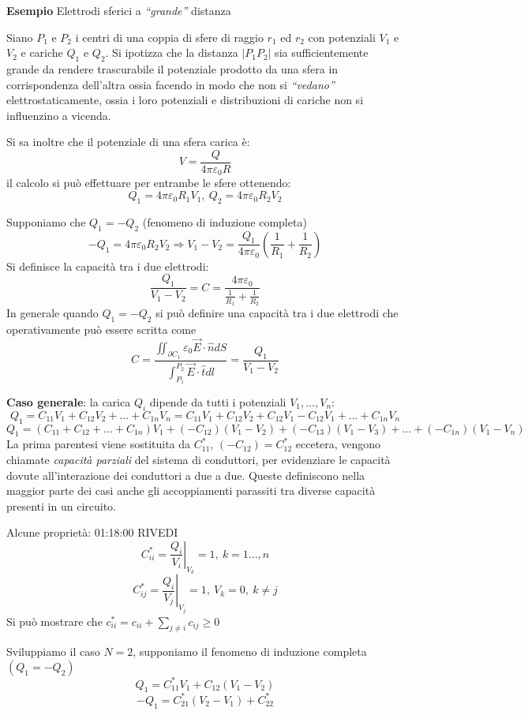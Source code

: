 \textbf{Esempio} Elettrodi sferici a \textit{``grande''} distanza

Siano $P_1$ e $P_2$ i centri di una coppia di sfere di raggio $r_1$ ed $r_2$ con potenziali $V_1$ e
$V_2$ e cariche $Q_1$ e $Q_2$.
Si ipotizza che la distanza $|P_1P_2|$ sia sufficientemente grande da rendere trascurabile il potenziale
prodotto da una sfera in corrispondenza dell'altra ossia facendo in modo che non si \textit{``vedano''} 
elettrostaticamente, ossia i loro potenziali e distribuzioni di cariche non si influenzino a vicenda.

Si sa inoltre che il potenziale di una sfera carica è:
$$
V = \frac{Q}{4 \pi \varepsilon_0 R}
$$
il calcolo si può effettuare per entrambe le sfere ottenendo:
$$
Q_1 = 4 \pi \varepsilon_0 R_1 V_1,\ Q_2 = 4 \pi \varepsilon_0 R_2 V_2
$$

Supponiamo che $Q_1 = -Q_2$ (fenomeno di induzione completa)
$$
-Q_1 = 4 \pi \varepsilon_0 R_2 V_2 \Rightarrow V_1 - V_2 = \frac{Q_1}{4 \pi \varepsilon_0}
\left(\frac{1}{R_1} + \frac{1}{R_2}\right)
$$
Si definisce la capacità tra i due elettrodi:
$$
\frac{Q_1}{V_1 - V_2} = C = \frac{4 \pi \varepsilon_0}{\frac{1}{R_1}+\frac{1}{R_2}}
$$
In generale quando $Q_1 = - Q_2$ si può definire una capacità tra i due elettrodi che operativamente
può essere scritta come 
$$
C = \frac{\iint_{\partial C_1} \varepsilon_0 \vec{E}\cdot\hat{n}dS} {\int_{P_1}^{P_2}\vec{E}\cdot\hat{t} dl} = \frac{Q_1}{V_1 - V_2}
$$


\textbf{Caso generale}: la carica $Q_i$ dipende da tutti i potenziali $V_1, \ldots ,V_n$:
$$
Q_1 = C_{11}V_1 + C_{12}V_2 + \ldots + C_{1n}V_n = C_{11}V_1 + C_{12}V_2 + C_{12}V_1 - C_{12} V_1 +
... + C_{1n}V_n
$$
$$
Q_1 = \left(C_{11}+C_{12} + \ldots + C_{1n}\right) V_1 + (-C_{12})(V_1-V_2) + (-C_{13})(V_1-V_3)
+ \ldots + (-C_{1n})(V_1-V_n)
$$
La prima parentesi viene sostituita da $C_{11}^*$, $(-C_{12}) = C_{12}^*$ eccetera, vengono chiamate
\textit{capacità parziali} del sistema di conduttori, per evidenziare le capacità 
dovute all'interazione dei conduttori a due a due.
Queste definiscono nella maggior parte dei casi anche gli accoppiamenti parassiti
tra diverse capacità presenti in un circuito.

Alcune proprietà: 01:18:00 RIVEDI
$$
C_{ii}^* = \left.\frac{Q_i}{V_i}\right|_{V_k} = 1,\ k=1...,n
$$
$$
C_{ij}^* = \left.\frac{Q_i}{V_j}\right|_{V_j}=1,\ V_k = 0,\ k \neq j
$$
Si può mostrare che $c_{ii}^* =c_{ii} + \sum_{j\neq i}c_{ij} \geq 0$


Sviluppiamo il caso $N = 2$, supponiamo il fenomeno di induzione completa $(Q_1 = -Q_2)$
$$
Q_1 = C_{11}^*V_1 + C_{12}(V_1-V_2)
$$
$$
-Q_1 = C_{21}^*(V_2-V_1) + C_{22}^*
$$


